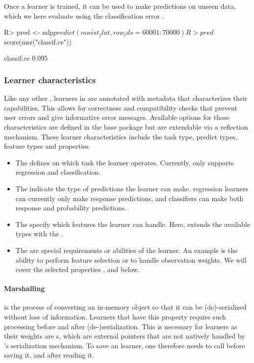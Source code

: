 \documentclass[article]{jss}
\theoremstyle{definition}
\begin{document}
Once a learner is trained, it can be used to make predictions on unseen data, which we here evaluate using the classification error .

\begin{CodeInput}
R> pred <- mlp$predict(mnist_flat, row_ids = 60001:70000)
R> pred$score(msr("classif.ce"))
\end{CodeInput}

\begin{CodeOutput}
classif.ce
     0.095
\end{CodeOutput}

\subsubsection{Learner characteristics}\label{sec:learner-characteristics}

Like any other , learners in  are annotated with metadata that characterizes their capabilities.
This allows for correctness and compatibility checks that prevent user errors and give informative error messages.
Available options for those characteristics are defined in the  base package but are extendable via a reflection mechanism.
These learner characteristics include the task type, predict types, feature types and properties.

\begin{itemize}
    \item The  defines on which task the learner operates. Currently,  only supports regression and classification.
    \item The  indicate the type of predictions the learner can make. \torch{} regression learners can currently only make response predictions, and classifiers can make both response and probability predictions.
    \item The  specify which features the learner can handle. Here, \mlrttorch{} extends the available types with the .
    \item The  are special requirements or abilities of the learner. An example is the ability to perform feature selection or to handle observation weights. We will cover the selected properties ,  and  below.
\end{itemize}


\paragraph{Marshalling} is the process of converting an in-memory object so that it can be (de)-serialized without loss of information.
Learners that have this property require such processing before and after (de-)serialization.
This is necessary for \torch{} learners as their weights are s, which are external pointers that are not natively handled by \rlang{}'s serialization mechanism.
To save an \mlrttorch{} learner, one therefore needs to call  before saving it, and  after reading it.
\end{document}
